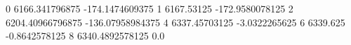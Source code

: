 0 6166.341796875 -174.1474609375
1 6167.53125 -172.9580078125
2 6204.40966796875 -136.07958984375
4 6337.45703125 -3.0322265625
6 6339.625 -0.8642578125
8 6340.4892578125 0.0
